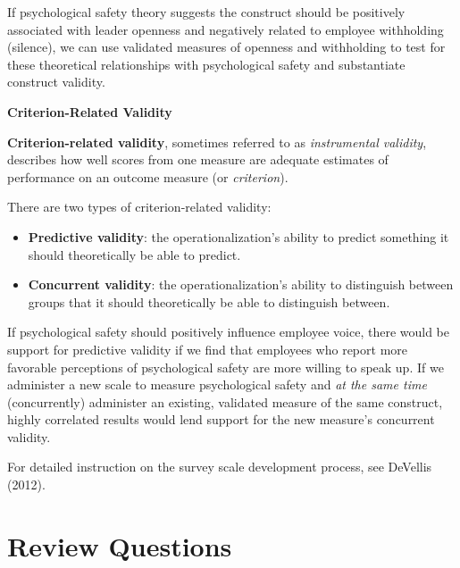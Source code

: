 \documentclass[
]{book}
\providecommand{\tightlist}{%
  \setlength{\itemsep}{0pt}\setlength{\parskip}{0pt}}
\begin{document}
If psychological safety theory suggests the construct should be positively associated with leader openness and negatively related to employee withholding (silence), we can use validated measures of openness and withholding to test for these theoretical relationships with psychological safety and substantiate construct validity.

\textbf{Criterion-Related Validity}

\textbf{Criterion-related validity}, sometimes referred to as \emph{instrumental validity}, describes how well scores from one measure are adequate estimates of performance on an outcome measure (or \emph{criterion}).

There are two types of criterion-related validity:

\begin{itemize}
\tightlist
\item
  \textbf{Predictive validity}: the operationalization's ability to predict something it should theoretically be able to predict.
\item
  \textbf{Concurrent validity}: the operationalization's ability to distinguish between groups that it should theoretically be able to distinguish between.
\end{itemize}

If psychological safety should positively influence employee voice, there would be support for predictive validity if we find that employees who report more favorable perceptions of psychological safety are more willing to speak up. If we administer a new scale to measure psychological safety and \emph{at the same time} (concurrently) administer an existing, validated measure of the same construct, highly correlated results would lend support for the new measure's concurrent validity.

For detailed instruction on the survey scale development process, see DeVellis (2012).

\hypertarget{review-questions-3}{%
\section{Review Questions}\label{review-questions-3}}
\end{document}
